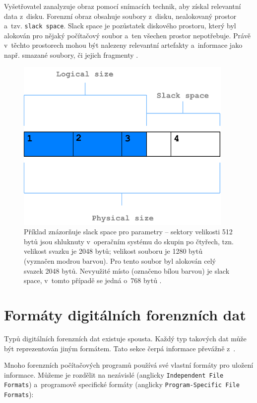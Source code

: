 Vyšetřovatel zanalyzuje obraz pomocí snímacích technik, aby získal relevantní data z~disku. Forenzní obraz obsahuje soubory z~disku, nealokovaný prostor a~tzv. \texttt{slack space}. Slack space je pozůstatek diskového prostoru, který byl alokován pro nějaký počítačový soubor a~ten všechen prostor nepotřebuje. Právě v~těchto prostorech mohou být nalezeny relevantní artefakty a~informace jako např. smazané soubory, či jejich fragmenty \cite{forensicImages}.

\begin{figure}[!h]
  \centering
  \includegraphics[width=10.5cm]{template-fig/SlackSpace.pdf}
  \caption{Příklad znázorňuje slack space pro parametry -- sektory velikosti 512 bytů jsou shluknuty v~operačním systému do skupin po čtyřech, tzn. velikost svazku je 2048 bytů; velikost souboru je 1280 bytů (vyznačen modrou barvou). Pro tento soubor byl alokován celý svazek 2048 bytů. Nevyužité místo (označeno bílou barvou) je slack space, v~tomto případě se jedná o~768 bytů \cite{slacSpace}.}
  \label{FIG_SlackSpace}
\end{figure}

\section{Formáty digitálních forenzních dat}
Typů digitálních forenzních dat existuje spousta. Každý typ takových dat může být reprezentován jiným formátem. Tato sekce čerpá informace převážně z~\cite{forensicswikiForensicFF}.

Mnoho forenzních počítačových programů používá své vlastní formáty pro uložení informace. Můžeme je rozdělit na nezávislé (anglicky \texttt{Independent File Formats}) a~programově specifické formáty (anglicky \texttt{Program-Specific File Formats}):

